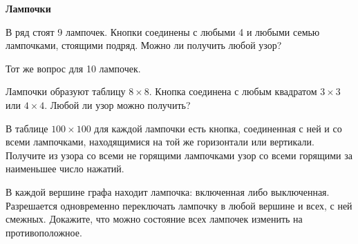 \documentclass{article}
\begin{document}
    \large

    \begin{center}
        \textbf{Лампочки}
    \end{center}

    \begin{enumerate_boxed}

        \item В ряд стоят 9 лампочек.
        Кнопки соединены с любыми 4 и любыми семью лампочками, стоящими подряд.
        Можно ли получить любой узор?

        \item Тот же вопрос для 10 лампочек.

        \item Лампочки образуют таблицу $8 \times 8$.
        Кнопка соединена с любым квадратом $3 \times 3$
        или $4 \times 4$.
        Любой ли узор можно получить?

        \item В таблице $100 \times 100$ для каждой лампочки есть кнопка, соединенная с ней и со всеми лампочками, находящимися на той же горизонтали или вертикали.
        Получите из узора со всеми не горящими лампочками узор со всеми горящими за наименьшее число нажатий.

        \item В каждой вершине графа находит лампочка: включенная либо выключенная.
        Разрешается одновременно переключать лампочку в любой вершине и всех, с ней смежных.
        Докажите, что можно состояние всех лампочек изменить на противоположное.

    \end{enumerate_boxed}
\end{document}
